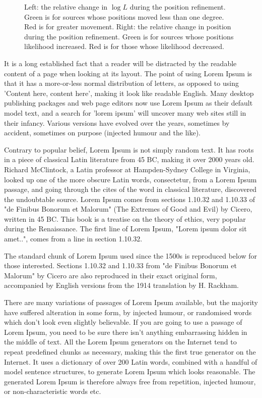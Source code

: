 \documentclass[useAMS,usenatbib]{mn2e}
\begin{document}
\begin{figure}
  \caption{Left: the relative change in $\log L$ during the position
    refinement.  Green is for sources whose positions moved less than
    one degree.  Red is for greater movement.  Right: the relative
    change in position during the position refinement.  Green is for
    sources whose positions likelihood increased.  Red is for those
    whose likelihood decreased.}
  \label{fig:position}
\end{figure}


It is a long established fact that a reader will be distracted by the
readable content of a page when looking at its layout. The point of
using Lorem Ipsum is that it has a more-or-less normal distribution of
letters, as opposed to using 'Content here, content here', making it
look like readable English. Many desktop publishing packages and web
page editors now use Lorem Ipsum as their default model text, and a
search for 'lorem ipsum' will uncover many web sites still in their
infancy. Various versions have evolved over the years, sometimes by
accident, sometimes on purpose (injected humour and the like).

 Contrary to popular belief, Lorem Ipsum is not simply random text. It
has roots in a piece of classical Latin literature from 45 BC, making
it over 2000 years old. Richard McClintock, a Latin professor at
Hampden-Sydney College in Virginia, looked up one of the more obscure
Latin words, consectetur, from a Lorem Ipsum passage, and going
through the cites of the word in classical literature, discovered the
undoubtable source. Lorem Ipsum comes from sections 1.10.32 and
1.10.33 of "de Finibus Bonorum et Malorum" (The Extremes of Good and
Evil) by Cicero, written in 45 BC. This book is a treatise on the
theory of ethics, very popular during the Renaissance. The first line
of Lorem Ipsum, "Lorem ipsum dolor sit amet..", comes from a line in
section 1.10.32.

The standard chunk of Lorem Ipsum used since the 1500s is reproduced
below for those interested. Sections 1.10.32 and 1.10.33 from "de
Finibus Bonorum et Malorum" by Cicero are also reproduced in their
exact original form, accompanied by English versions from the 1914
translation by H. Rackham.

There are many variations of passages of Lorem Ipsum available, but
the majority have suffered alteration in some form, by injected
humour, or randomised words which don't look even slightly
believable. If you are going to use a passage of Lorem Ipsum, you need
to be sure there isn't anything embarrassing hidden in the middle of
text. All the Lorem Ipsum generators on the Internet tend to repeat
predefined chunks as necessary, making this the first true generator
on the Internet. It uses a dictionary of over 200 Latin words,
combined with a handful of model sentence structures, to generate
Lorem Ipsum which looks reasonable. The generated Lorem Ipsum is
therefore always free from repetition, injected humour, or
non-characteristic words etc.
\end{document}
